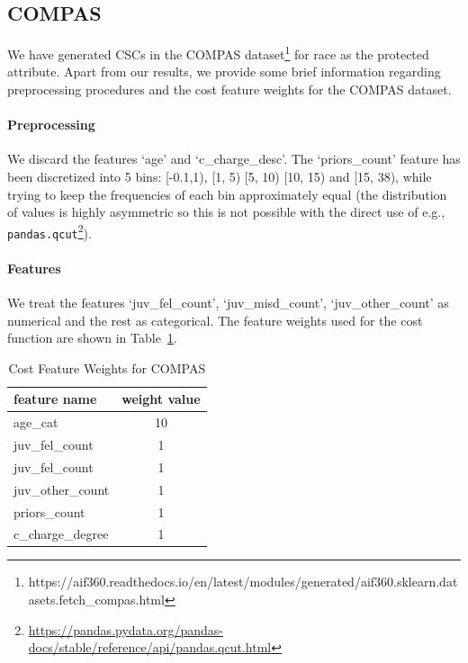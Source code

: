 \documentclass{article}
\begin{document}




\subsection{COMPAS}
We have generated CSCs in the COMPAS dataset\footnote{https://aif360.readthedocs.io/en/latest/modules/generated/aif360.sklearn.datasets.fetch\_compas.html} for race as the protected attribute. Apart from our results, we provide some brief information regarding 
preprocessing procedures and the cost feature weights for the COMPAS dataset. 

\paragraph{Preprocessing} We discard the features `age' and `c\_charge\_desc'. The `priors\_count' feature has been discretized into 5 bins: [-0.1,1), [1, 5) [5, 10) [10, 15) and [15, 38), while trying to keep the frequencies of each bin approximately equal (the distribution of values is highly asymmetric so this is not possible with the direct use of e.g., \verb|pandas.qcut|\footnote{\url{https://pandas.pydata.org/pandas-docs/stable/reference/api/pandas.qcut.html}}).

\paragraph{Features} We treat the features `juv\_fel\_count', `juv\_misd\_count', `juv\_other\_count' as numerical and the rest as categorical. The feature weights used for the cost function are shown in Table~\ref{table:feature-weights-compas}.
\begin{table}[ht]
\small
\caption{Cost Feature Weights for COMPAS}
    \label{table:feature-weights-compas}
    \centering
    
    \begin{tabular}{lc}
        \toprule
        \textbf{feature name} & \textbf{weight value}  \\
        \midrule
        age\_cat & 10  \\
        juv\_fel\_count & 1 \\
        juv\_fel\_count & 1 \\
        juv\_other\_count & 1 \\
        priors\_count & 1 \\
        c\_charge\_degree & 1\\
        \bottomrule
    \end{tabular}
    
\end{table}
\end{document}
